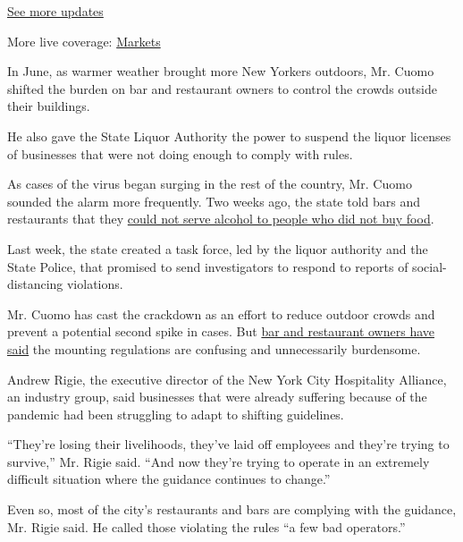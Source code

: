 \href{https://www.nytimes3xbfgragh.onion/2020/08/01/world/coronavirus-covid-19.html?action=click\&pgtype=Article\&state=default\&region=MAIN_CONTENT_1\&context=storylines_live_updates}{See
more updates}

More live coverage:
\href{https://www.nytimes3xbfgragh.onion/live/2020/07/31/business/stock-market-today-coronavirus?action=click\&pgtype=Article\&state=default\&region=MAIN_CONTENT_1\&context=storylines_live_updates}{Markets}

In June, as warmer weather brought more New Yorkers outdoors, Mr. Cuomo
shifted the burden on bar and restaurant owners to control the crowds
outside their buildings.

He also gave the State Liquor Authority the power to suspend the liquor
licenses of businesses that were not doing enough to comply with rules.

As cases of the virus began surging in the rest of the country, Mr.
Cuomo sounded the alarm more frequently. Two weeks ago, the state told
bars and restaurants that they
\href{https://www.nytimes3xbfgragh.onion/2020/07/16/nyregion/ny-bars-open-cuomo.html?module=inline}{could
not serve alcohol to people who did not buy food}.

Last week, the state created a task force, led by the liquor authority
and the State Police, that promised to send investigators to respond to
reports of social-distancing violations.

Mr. Cuomo has cast the crackdown as an effort to reduce outdoor crowds
and prevent a potential second spike in cases. But
\href{https://www.nytimes3xbfgragh.onion/2020/07/20/nyregion/nyc-phase-4-reopening-bars.html?module=inline}{bar
and restaurant owners have said} the mounting regulations are confusing
and unnecessarily burdensome.

Andrew Rigie, the executive director of the New York City Hospitality
Alliance, an industry group, said businesses that were already suffering
because of the pandemic had been struggling to adapt to shifting
guidelines.

``They're losing their livelihoods, they've laid off employees and
they're trying to survive,'' Mr. Rigie said. ``And now they're trying to
operate in an extremely difficult situation where the guidance continues
to change.''

Even so, most of the city's restaurants and bars are complying with the
guidance, Mr. Rigie said. He called those violating the rules ``a few
bad operators.''


